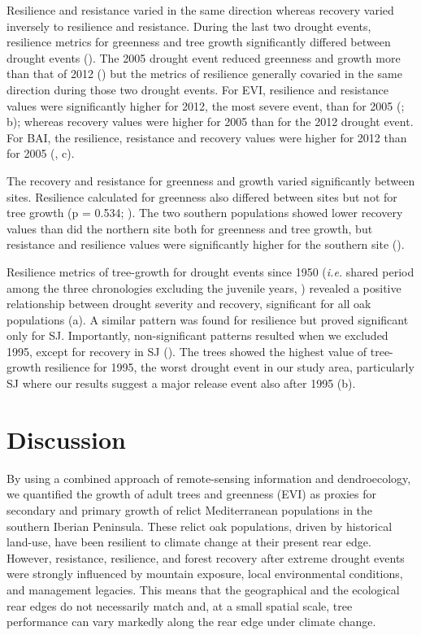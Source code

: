 Resilience and resistance varied in the same direction whereas recovery varied inversely to resilience and resistance. During the last two drought events, resilience metrics for greenness and tree growth significantly differed between drought events (). The 2005 drought event reduced greenness and growth more than that of 2012 () but the metrics of resilience generally covaried in the same direction during those two drought events. For EVI, resilience and resistance values were significantly higher for 2012, the most severe event, than for 2005 (; b); whereas recovery values were higher for 2005 than for the 2012 drought event. For BAI, the resilience, resistance and recovery values were higher for 2012 than for 2005 (, c).

The recovery and resistance for greenness and growth varied significantly between sites. Resilience calculated for greenness also differed between sites but not for tree growth (p = 0.534; ). The two southern populations showed lower recovery values than did the northern site both for greenness and tree growth, but resistance and resilience values were significantly higher for the southern site ().

Resilience metrics of tree-growth for drought events since 1950 (\emph{i.e.} shared period among the three chronologies excluding the juvenile years, ) revealed a positive relationship between drought severity and recovery, significant for all oak populations (a). A similar pattern was found for resilience but proved significant only for SJ. Importantly, non-significant patterns resulted when we excluded 1995, except for recovery in SJ (). The trees showed the highest value of tree-growth resilience for 1995, the worst drought event in our study area, particularly SJ where our results suggest a major release event also after 1995 (b).

\section{Discussion}\label{sec:dendro:Discussion}
By using a combined approach of remote-sensing information and dendroecology, we quantified the growth of adult trees and greenness (EVI) as proxies for secondary and primary growth of relict Mediterranean \Qpy populations in the southern Iberian Peninsula. These relict oak populations, driven by historical land-use, have been resilient to climate change at their present rear edge. However, resistance, resilience, and forest recovery after extreme drought events were strongly influenced by mountain exposure, local environmental conditions, and management legacies. This means that the geographical and the ecological rear edges do not necessarily match and, at a small spatial scale, tree performance can vary markedly along the rear edge under climate change.


